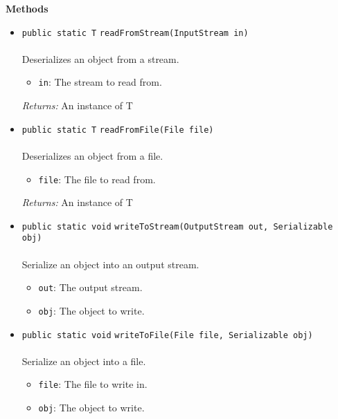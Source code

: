 \textbf{\sffamily Methods}
\begin{itemize}
\item \lstinline|public static T| \lstinline|readFromStream|\lstinline|(InputStream in)|\\ \\[-0.6em]
Deserializes an object from a stream.
\begin{itemize}
\item \lstinline|in|: The stream to read from.
\end{itemize}

\emph{Returns:} An instance of T

\item \lstinline|public static T| \lstinline|readFromFile|\lstinline|(File file)|\\ \\[-0.6em]
Deserializes an object from a file.
\begin{itemize}
\item \lstinline|file|: The file to read from.
\end{itemize}

\emph{Returns:} An instance of T

\item \lstinline|public static void| \lstinline|writeToStream|\lstinline|(OutputStream out, Serializable obj)|\\ \\[-0.6em]
Serialize an object into an output stream.
\begin{itemize}
\item \lstinline|out|: The output stream.
\item \lstinline|obj|: The object to write.
\end{itemize}



\item \lstinline|public static void| \lstinline|writeToFile|\lstinline|(File file, Serializable obj)|\\ \\[-0.6em]
Serialize an object into a file.
\begin{itemize}
\item \lstinline|file|: The file to write in.
\item \lstinline|obj|: The object to write.
\end{itemize}



\end{itemize}

